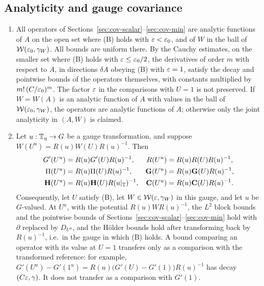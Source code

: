 \subsection{Analyticity and gauge covariance}

\begin{proposition}\label{prop:covariance}
\begin{enumerate}[label=(\alph*)]
\item All operators of Sections~\ref{sec:cov-scalar}--\ref{sec:cov-min} are analytic functions of $A$ on the open set where (B) holds with $\varepsilon<\varepsilon_0$, and of $W$ in the ball of $\mathcal W(\varepsilon_0,\gamma_W)$. All bounds are uniform there. By the Cauchy estimates, on the smaller set where (B) holds with $\varepsilon\le\varepsilon_0/2$, the derivatives of order $m$ with respect to $A$, in directions $\delta A$ obeying (B) with $\varepsilon=1$, satisfy the decay and pointwise bounds of the operators themselves, with constants multiplied by $m!\,(C/\varepsilon_0)^m$. The factor $\varepsilon$ in the comparisons with $U=1$ is not preserved. If $W=W(A)$ is an analytic function of $A$ with values in the ball of $\mathcal W(\varepsilon_0,\gamma_W)$, the operators are analytic functions of $A$; otherwise only the joint analyticity in $(A,W)$ is claimed.
\item Let $u:\mathbb T_\eta\to G$ be a gauge transformation, and suppose $W(U^u)=R(u)W(U)R(u)^{-1}$. Then
\begin{align*}
G'(U^u)&=R(u)G'(U)R(u)^{-1}, & R(U^u)&=R(u)R(U)R(u)^{-1},\\
\Pi(U^u)&=R(u)\Pi(U)R(u)^{-1}, & \mathbf G(U^u)&=R(u)\mathbf G(U)R(u)^{-1},\\
\mathbf H(U^u)&=R(u)\mathbf H(U)R(u|_\mathbb T)^{-1}, & \mathbf C(U^u)&=R(u)\mathbf C(U)R(u)^{-1}.
\end{align*}
Consequently, let $U$ satisfy (B), let $W\in\mathcal W(\varepsilon,\gamma_W)$ in this gauge, and let $u$ be $G$-valued. At $U^u$, with the potential $R(u)WR(u)^{-1}$, the $L^2$ block bounds and the pointwise bounds of Sections~\ref{sec:cov-scalar}--\ref{sec:cov-min} hold with $\partial$ replaced by $D_{U^u}$, and the H\"older bounds hold after transforming back by $R(u)^{-1}$, i.e.\ in the gauge in which (B) holds. A bound comparing an operator with its value at $U=1$ transfers only as a comparison with the transformed reference: for example, $G'(U^u)-G'(1^u)=R(u)\big(G'(U)-G'(1)\big)R(u)^{-1}$ has decay $(C\varepsilon,\gamma)$. It does not transfer as a comparison with $G'(1)$.
\end{enumerate}
\end{proposition}

